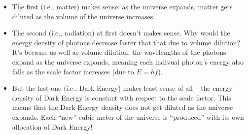 \documentclass[11pt]{article}
\begin{document}
\begin{itemize}
\begin{itemize}
\end{itemize}
\item The first (i.e., matter) makes sense: as the universe expands, matter gets diluted as the volume of the universe increases.
\item The second (i.e., radiation) at first doesn't makes sense. Why would the energy density of photons decrease faster that that due to volume dilution? It's because as well as volume dilution, the wavelengths of the photons expand as the universe expands, meaning each indivual photon's energy also falls as the scale factor increases (due to $E=hf$).
\item But the last one (i.e., Dark Energy) makes least sense of all -- the energy density of Dark Energy is constant with respect to the scale factor. This means that the Dark Energy density does not get diluted as the universe expands. Each ``new'' cubic meter of the universe is ``produced'' with its own allocation of Dark Energy!
\end{itemize}
\end{document}
